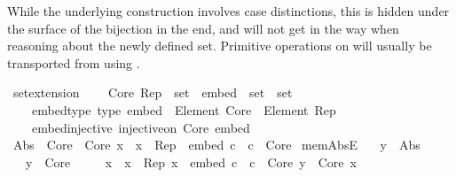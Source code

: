 \begin{isabellebody}
\begin{isamarkuptext}
\begin{itemize}
While the underlying construction involves case distinctions, this is hidden
under the surface of the bijection in the end, and will not get in the way
when reasoning about the newly defined set. Primitive operations on  will
usually be transported from  using .%
\end{itemize}%
\end{isamarkuptext}\isamarkuptrue%
\isamarkupfalse%
\ set{\isacharunderscore}{\kern0pt}extension\ {\isacharequal}{\kern0pt}\isanewline
\ \ \ Core\ Rep\ {\isacharcolon}{\kern0pt}{\isacharcolon}{\kern0pt}\ set\ \ embed\ {\isacharcolon}{\kern0pt}{\isacharcolon}{\kern0pt}\ {\isachardoublequoteopen}set\ {\isasymRightarrow}\ set{\isachardoublequoteclose}\isanewline
\ \ \isanewline
\ \ \ \ embed{\isacharunderscore}{\kern0pt}type\ {\isacharbrackleft}{\kern0pt}type{\isacharbrackright}{\kern0pt}{\isacharcolon}{\kern0pt}\ {\isachardoublequoteopen}embed\ {\isacharcolon}{\kern0pt}\ Element\ Core\ {\isasymRightarrow}\ Element\ Rep{\isachardoublequoteclose}\ \isanewline
\ \ \ \ embed{\isacharunderscore}{\kern0pt}injective{\isacharcolon}{\kern0pt}\ {\isachardoublequoteopen}injective{\isacharunderscore}{\kern0pt}on\ Core\ embed{\isachardoublequoteclose}\isanewline
{}\isanewline
\isanewline
{}\isamarkupfalse%
\ {\isachardoublequoteopen}Abs\ {\isasymequiv}\ Core\ {\isasymunion}\ {\isacharbraceleft}{\kern0pt}{\isasymlangle}Core{\isacharcomma}{\kern0pt}\ x{\isasymrangle}\ {\isacharbar}{\kern0pt}\ x\ {\isasymin}\ {\isacharparenleft}{\kern0pt}Rep\ {\isasymsetminus}\ {\isacharbraceleft}{\kern0pt}embed\ c\ {\isacharbar}{\kern0pt}\ c\ {\isasymin}\ Core{\isacharbraceright}{\kern0pt}{\isacharparenright}{\kern0pt}{\isacharbraceright}{\kern0pt}{\isachardoublequoteclose}\isanewline
\isanewline
{}\isamarkupfalse%
\ mem{\isacharunderscore}{\kern0pt}AbsE{\isacharcolon}{\kern0pt}\isanewline
\ \ \ {\isachardoublequoteopen}y\ {\isasymin}\ Abs{\isachardoublequoteclose}\isanewline
\ \ \ {\isachardoublequoteopen}y\ {\isasymin}\ Core{\isachardoublequoteclose}\isanewline
\ \ \ \ {\isacharbar}{\kern0pt}\ x\ \ {\isachardoublequoteopen}x\ {\isasymin}\ Rep{\isachardoublequoteclose}\ {\isachardoublequoteopen}x\ {\isasymnotin}\ {\isacharbraceleft}{\kern0pt}embed\ c\ {\isacharbar}{\kern0pt}\ c\ {\isasymin}\ Core{\isacharbraceright}{\kern0pt}{\isachardoublequoteclose}\ {\isachardoublequoteopen}y\ {\isacharequal}{\kern0pt}\ {\isasymlangle}Core{\isacharcomma}{\kern0pt}\ x{\isasymrangle}{\isachardoublequoteclose}\isanewline

\end{isabellebody}
